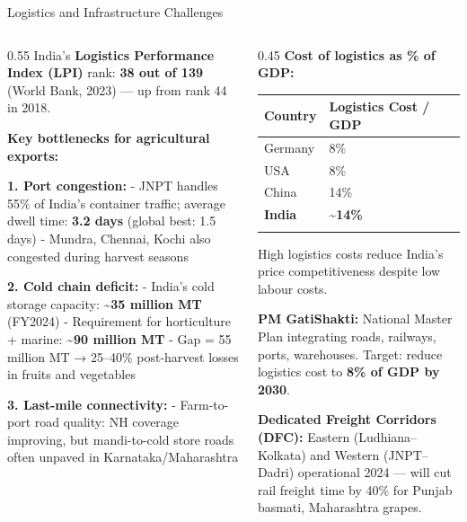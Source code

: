 \documentclass[
  ignorenonframetext,
  aspectratio=169,
]{beamer}
\makeatletter
\let\quarto@originallabel\label
\DeclareRobustCommand*{\label}[1]{\quarto@originallabel{#1}}
\makeatother
\begin{document}
\begin{frame}
\begin{block}{Logistics and Infrastructure Challenges}
\label{logistics-and-infrastructure-challenges}
\begin{columns}[T]
\begin{column}{0.55\linewidth}
India's \textbf{Logistics Performance Index (LPI)} rank: \textbf{38 out
of 139} (World Bank, 2023) --- up from rank 44 in 2018.

\textbf{Key bottlenecks for agricultural exports:}

\textbf{1. Port congestion:} - JNPT handles 55\% of India's container
traffic; average dwell time: \textbf{3.2 days} (global best: 1.5 days) -
Mundra, Chennai, Kochi also congested during harvest seasons

\textbf{2. Cold chain deficit:} - India's cold storage capacity:
\textbf{\textasciitilde35 million MT} (FY2024) - Requirement for
horticulture + marine: \textbf{\textasciitilde90 million MT} - Gap = 55
million MT → 25--40\% post-harvest losses in fruits and vegetables

\textbf{3. Last-mile connectivity:} - Farm-to-port road quality: NH
coverage improving, but mandi-to-cold store roads often unpaved in
Karnataka/Maharashtra
\end{column}

\begin{column}{0.45\linewidth}
\textbf{Cost of logistics as \% of GDP:}

\begin{longtable}[]{@{}ll@{}}
\toprule\noalign{}
Country & Logistics Cost / GDP \\
\midrule\noalign{}
\endhead
Germany & 8\% \\
USA & 8\% \\
China & 14\% \\
\textbf{India} & \textbf{\textasciitilde14\%} \\
\bottomrule\noalign{}
\end{longtable}

High logistics costs reduce India's price competitiveness despite low
labour costs.

\textbf{PM GatiShakti:} National Master Plan integrating roads,
railways, ports, warehouses. Target: reduce logistics cost to
\textbf{8\% of GDP by 2030}.

\textbf{Dedicated Freight Corridors (DFC):} Eastern (Ludhiana--Kolkata)
and Western (JNPT--Dadri) operational 2024 --- will cut rail freight
time by 40\% for Punjab basmati, Maharashtra grapes.
\end{column}
\end{columns}
\end{block}
\end{frame}
\end{document}

